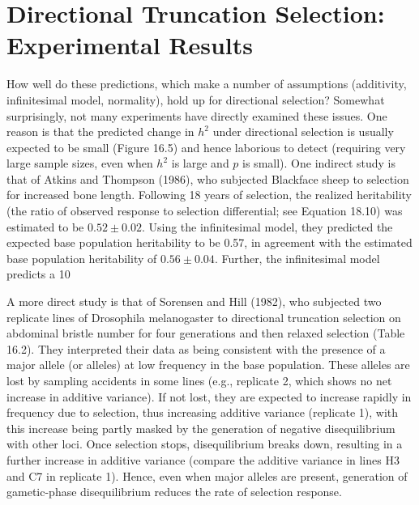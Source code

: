\documentclass{article}
\begin{document}
\section{Directional Truncation Selection: Experimental Results}
How well do these predictions, which make a number of assumptions (additivity, infinitesimal model, normality), hold up for directional selection? Somewhat surprisingly, not many experiments have directly examined these issues. One reason is that the predicted change in  $ h^2 $ under directional selection is usually expected to be small (Figure 16.5) and hence laborious to detect (requiring very large sample sizes, even when  $ h^2 $ is large and  $ p $ is small). One indirect study is that of Atkins and Thompson (1986), who subjected Blackface sheep to selection for increased bone length. Following 18 years of selection, the realized heritability (the ratio of observed response to selection differential; see Equation 18.10) was estimated to be  $ 0.52 \pm 0.02 $. Using the infinitesimal model, they predicted the expected base population heritability to be 0.57, in agreement with the estimated base population heritability of  $ 0.56 \pm 0.04 $. Further, the infinitesimal model predicts a 10%

A more direct study is that of Sorensen and Hill (1982), who subjected two replicate lines of Drosophila melanogaster to directional truncation selection on abdominal bristle number for four generations and then relaxed selection (Table 16.2). They interpreted their data as being consistent with the presence of a major allele (or alleles) at low frequency in the base population. These alleles are lost by sampling accidents in some lines (e.g., replicate 2, which shows no net increase in additive variance). If not lost, they are expected to increase rapidly in frequency due to selection, thus increasing additive variance (replicate 1), with this increase being partly masked by the generation of negative disequilibrium with other loci. Once selection stops, disequilibrium breaks down, resulting in a further increase in additive variance (compare the additive variance in lines H3 and C7 in replicate 1). Hence, even when major alleles are present, generation of gametic-phase disequilibrium reduces the rate of selection response.
\end{document}
